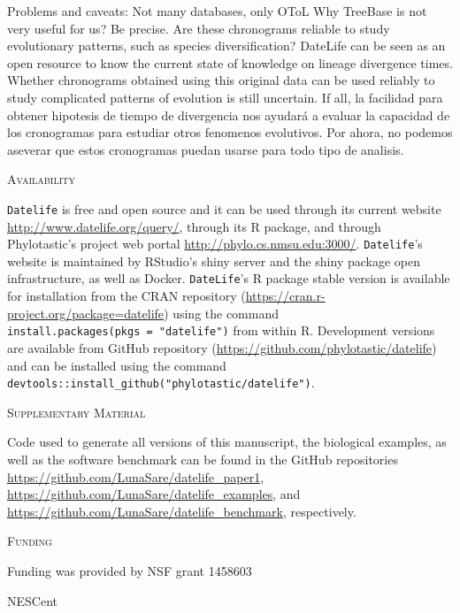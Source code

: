 \documentclass[]{article}
\begin{document}
Problems and caveats:
Not many databases, only OToL
Why TreeBase is not very useful for us? Be precise.
Are these chronograms reliable to study evolutionary patterns, such as species diversification?
DateLife can be seen as an open resource to know the current state of knowledge on lineage divergence times.
Whether chronograms obtained using this original data can be used reliably to study complicated patterns of evolution is still uncertain.
If all, la facilidad para obtener hipotesis de tiempo de divergencia nos ayudará a evaluar la capacidad de los cronogramas para estudiar otros fenomenos evolutivos.
Por ahora, no podemos aseverar que estos cronogramas puedan usarse para todo tipo de analisis.

\begin{center}
\textsc{Availability}
\end{center}

\texttt{Datelife} is free and open source and it can be used through its current website
\url{http://www.datelife.org/query/}, through its R package, and through Phylotastic's project web portal \url{http://phylo.cs.nmsu.edu:3000/}.
\texttt{Datelife}'s website is maintained by RStudio's shiny server and the shiny package open infrastructure, as well as Docker.
\texttt{DateLife}'s R package stable version is available
for installation from the CRAN repository (\url{https://cran.r-project.org/package=datelife})
using the command \texttt{install.packages(pkgs\ =\ "datelife")} from within R. Development versions
are available from GitHub repository (\url{https://github.com/phylotastic/datelife})
and can be installed using the command \texttt{devtools::install\_github("phylotastic/datelife")}.

\begin{center}
\textsc{Supplementary Material}
\end{center}

Code used to generate all versions of this manuscript, the biological examples, as well as the software benchmark can be found in the GitHub repositories \url{https://github.com/LunaSare/datelife_paper1}, \url{https://github.com/LunaSare/datelife_examples}, and \url{https://github.com/LunaSare/datelife_benchmark}, respectively.

\begin{center}
\textsc{Funding}
\end{center}

Funding was provided by NSF grant 1458603

NESCent
\end{document}
